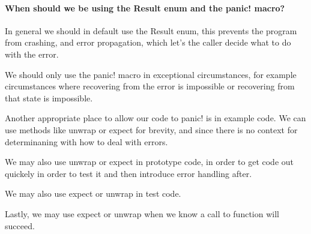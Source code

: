 \paragraph*{When should we be using the Result enum and the panic! macro?}

In general we should in default use the Result enum, this prevents the program from crashing, and error propagation, which let's the caller decide what to do with the error.

We should only use the panic! macro in exceptional circumstances, for example circumstances where recovering from the error is impossible or recovering from that state is impossible.

Another appropriate place to allow our code to panic! is in example code. We can use methods like unwrap or expect for brevity, and since there is no context for determinaning with how to deal with errors.

We may also use unwrap or expect in prototype code, in order to get code out quickely in order to test it and then introduce error handling after.

We may also use expect or unwrap in test code.

Lastly, we may use expect or unwrap when we know a call to function will succeed.
